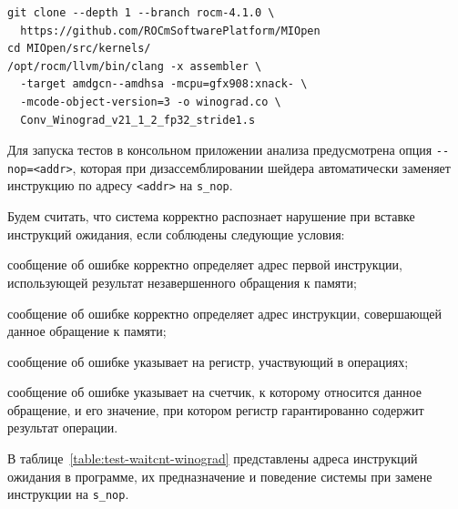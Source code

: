 \documentclass[a4paper,14pt]{extarticle}
\begin{document}
{\begin{verbatim}
git clone --depth 1 --branch rocm-4.1.0 \
  https://github.com/ROCmSoftwarePlatform/MIOpen
cd MIOpen/src/kernels/
/opt/rocm/llvm/bin/clang -x assembler \
  -target amdgcn--amdhsa -mcpu=gfx908:xnack- \
  -mcode-object-version=3 -o winograd.co \
  Conv_Winograd_v21_1_2_fp32_stride1.s
\end{verbatim}

Для запуска тестов в консольном приложении анализа предусмотрена опция
\verb|--nop=<addr>|, которая при дизассемблировании шейдера автоматически
заменяет инструкцию по адресу \verb|<addr>| на \verb|s_nop|.

Будем считать, что система корректно распознает нарушение при вставке инструкций
ожидания, если соблюдены следующие условия:
\begin{ul}
\item сообщение об ошибке корректно определяет адрес первой инструкции, использующей результат
незавершенного обращения к памяти;
\item сообщение об ошибке корректно определяет адрес инструкции, совершающей данное обращение к памяти;
\item сообщение об ошибке указывает на регистр, участвующий в операциях;
\item сообщение об ошибке указывает на счетчик, к которому относится данное обращение, и его значение,
при котором регистр гарантированно содержит результат операции.
\end{ul}

В таблице~\ref{table:test-waitcnt-winograd} представлены адреса инструкций ожидания
в программе, их предназначение и поведение системы при замене инструкции на \verb|s_nop|.

}
\end{document}

